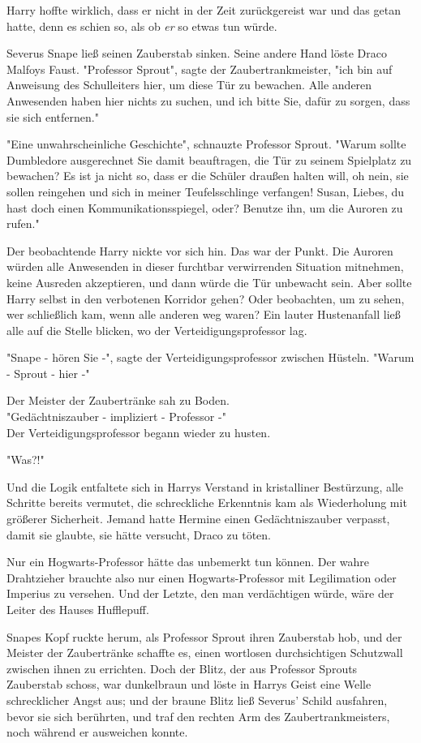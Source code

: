 {Harry hoffte wirklich, dass er nicht in der Zeit zurückgereist war und das getan hatte, denn es schien so, als ob \emph{er} so etwas tun würde.

Severus Snape ließ seinen Zauberstab sinken. Seine andere Hand löste Draco Malfoys Faust. "Professor Sprout", sagte der Zaubertrankmeister, "ich bin auf Anweisung des Schulleiters hier, um diese Tür zu bewachen. Alle anderen Anwesenden haben hier nichts zu suchen, und ich bitte Sie, dafür zu sorgen, dass sie sich entfernen."

"Eine unwahrscheinliche Geschichte", schnauzte Professor Sprout. "Warum sollte Dumbledore ausgerechnet Sie damit beauftragen, die Tür zu seinem Spielplatz zu bewachen? Es ist ja nicht so, dass er die Schüler draußen halten will, oh nein, sie sollen reingehen und sich in meiner Teufelsschlinge verfangen! Susan, Liebes, du hast doch einen Kommunikationsspiegel, oder? Benutze ihn, um die Auroren zu rufen."

Der beobachtende Harry nickte vor sich hin. Das war der Punkt. Die Auroren würden alle Anwesenden in dieser furchtbar verwirrenden Situation mitnehmen, keine Ausreden akzeptieren, und dann würde die Tür unbewacht sein. Aber sollte Harry selbst in den verbotenen Korridor gehen? Oder beobachten, um zu sehen, wer schließlich kam, wenn alle anderen weg waren? Ein lauter Hustenanfall ließ alle auf die Stelle blicken, wo der Verteidigungsprofessor lag.

"Snape - hören Sie -", sagte der Verteidigungsprofessor zwischen Hüsteln. "Warum - Sprout - hier -"

Der Meister der Zaubertränke sah zu Boden.\\ "Gedächtniszauber - impliziert - Professor -"\\ Der Verteidigungsprofessor begann wieder zu husten.

"Was?!"

Und die Logik entfaltete sich in Harrys Verstand in kristalliner Bestürzung, alle Schritte bereits vermutet, die schreckliche Erkenntnis kam als Wiederholung mit größerer Sicherheit. Jemand hatte Hermine einen Gedächtniszauber verpasst, damit sie glaubte, sie hätte versucht, Draco zu töten.

Nur ein Hogwarts-Professor hätte das unbemerkt tun können. Der wahre Drahtzieher brauchte also nur einen Hogwarts-Professor mit Legilimation oder Imperius zu versehen. Und der Letzte, den man verdächtigen würde, wäre der Leiter des Hauses Hufflepuff.

Snapes Kopf ruckte herum, als Professor Sprout ihren Zauberstab hob, und der Meister der Zaubertränke schaffte es, einen wortlosen durchsichtigen Schutzwall zwischen ihnen zu errichten. Doch der Blitz, der aus Professor Sprouts Zauberstab schoss, war dunkelbraun und löste in Harrys Geist eine Welle schrecklicher Angst aus; und der braune Blitz ließ Severus' Schild ausfahren, bevor sie sich berührten, und traf den rechten Arm des Zaubertrankmeisters, noch während er ausweichen konnte.

}
